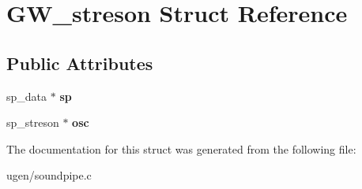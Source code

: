 \hypertarget{structGW__streson}{}\section{G\+W\+\_\+streson Struct Reference}
\label{structGW__streson}
\subsection*{Public Attributes}
\begin{DoxyCompactItemize}
\item 
\hypertarget{structGW__streson_a14049ad7203a179266766225ca282b8c}{}\label{structGW__streson_a14049ad7203a179266766225ca282b8c} 
sp\+\_\+data $\ast$ {\bfseries sp}
\item 
\hypertarget{structGW__streson_a7d735a84b819dad9fa82dba54d996e55}{}\label{structGW__streson_a7d735a84b819dad9fa82dba54d996e55} 
sp\+\_\+streson $\ast$ {\bfseries osc}
\end{DoxyCompactItemize}


The documentation for this struct was generated from the following file\+:\begin{DoxyCompactItemize}
\item 
ugen/soundpipe.\+c\end{DoxyCompactItemize}
